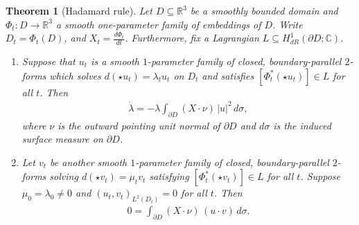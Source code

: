 \documentclass[11pt,reqno]{amsart}
\newtheorem{theorem}{Theorem}[section]
\begin{document}
\begin{theorem}[Hadamard rule]
\label{thm:hadamard_rule}
Let $D \subseteq \mathbb R^3$ be a smoothly bounded domain and $\Phi_t: D \to \mathbb R^3$ a smooth one-parameter family of embeddings of $D$. Write $D_t = \Phi_t (D)$, and $X_t = \frac{d\Phi_t}{dt}$. Furthermore, fix a Lagrangian $L \subseteq H^1_{dR}(\partial D;\mathbb C)$.
\begin{enumerate}[label=(\alph*)]
    \item Suppose that $u_t$ is a smooth $1$-parameter family of closed, boundary-parallel $2$-forms which solves $d ( \star u_t ) = \lambda_t u_t$ on $D_t$ and satisfies $[\Phi_t^\ast ( \star u_t)] \in L$ for all $t$.
    Then
    \begin{align}
        \Dot{\lambda} = - \lambda \int_{\partial D} (X \cdot \nu) \, |u|^2\, d\sigma,
    \end{align}
    where $\nu$ is the outward pointing unit normal of $\partial D$ and $d\sigma$ is the induced surface measure on $\partial D$.
    \item Let $v_t$ be another smooth $1$-parameter family of closed, boundary-parallel $2$-forms solving $d ( \star v_t ) = \mu_t v_t$ satisfying $[\Phi_t^\ast ( \star v_t)] \in L$ for all $t$. Suppose $\mu_0 = \lambda_0 \neq 0$ and $\left( u_t,v_t\right)_{L^2(D_t)} = 0$ for all $t$. Then 
    \begin{align}
        0 = \int_{\partial D} (X \cdot \nu) \, (u \cdot v) \, d\sigma.
    \end{align}
\end{enumerate}
\end{theorem}
\end{document}

